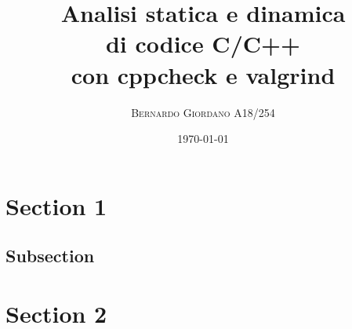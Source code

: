 \documentclass{article}
\title{Analisi statica e dinamica \\ di codice C/C++ \\ con cppcheck e valgrind}
\author{\textsc{Bernardo Giordano A18/254}}
\date{\today}
\begin{document}
\maketitle


\section{Section 1}

\subsection{Subsection}
\label{subsection}
 

\section{Section 2}




\end{document}
